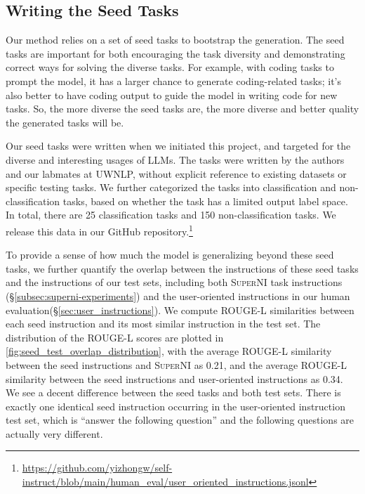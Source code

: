 \documentclass[11pt]{article}
\newcommand{\supernatShort}{\textsc{SuperNI}}
\begin{document}
\subsection{Writing the Seed Tasks}
\label{subsec:seed_tasks}

Our method relies on a set of seed tasks to bootstrap the generation. The seed tasks are important for both encouraging the task diversity and demonstrating correct ways for solving the diverse tasks. For example, with coding tasks to prompt the model, it has a larger chance to generate coding-related tasks; it’s also better to have coding output to guide the model in writing code for new tasks. So, the more diverse the seed tasks are, the more diverse and better quality the generated tasks will be. 

Our seed tasks were written when we initiated this project, and targeted for the diverse and interesting usages of LLMs. The tasks were written by the authors and our labmates at UWNLP, without explicit reference to existing datasets or specific testing tasks. We further categorized the tasks into classification and non-classification tasks, based on whether the task has a limited output label space. In total, there are 25 classification tasks and 150 non-classification tasks. We release this data in our GitHub repository.\footnote{\url{https://github.com/yizhongw/self-instruct/blob/main/human_eval/user_oriented_instructions.jsonl}}

To provide a sense of how much the model is generalizing beyond these seed tasks, we further quantify the overlap between the instructions of these seed tasks and the instructions of our test sets, including both \supernatShort{} task instructions (\S\ref{subsec:superni-experiments}) and the user-oriented instructions in our human evaluation(\S\ref{sec:user_instructions}). We compute ROUGE-L similarities between each seed instruction and its most similar instruction in the test set. The distribution of the ROUGE-L scores are plotted in \autoref{fig:seed_test_overlap_distribution}, with the average ROUGE-L similarity between the seed instructions and \supernatShort{} as 0.21, and the average ROUGE-L similarity between the seed instructions and user-oriented instructions as 0.34. We see a decent difference between the seed tasks and both test sets. There is exactly one identical seed instruction occurring in the user-oriented instruction test set, which is ``answer the following question'' and the following questions are actually very different.
\end{document}
